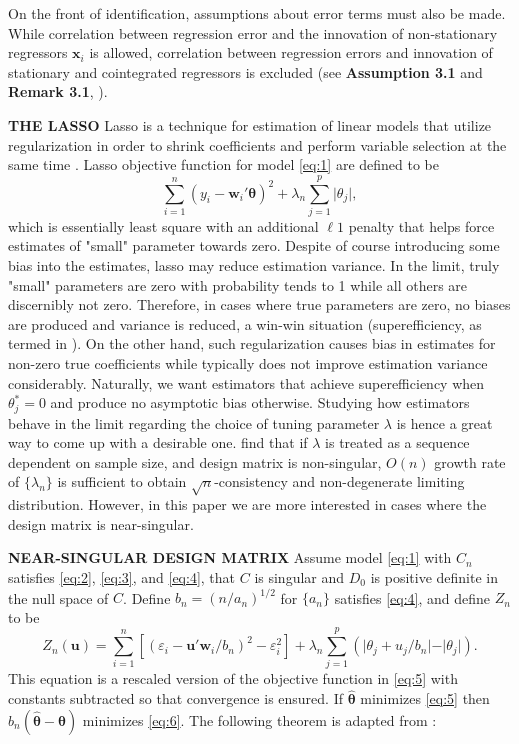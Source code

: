 \documentclass[12pt,a4paper]{article}
\DeclareMathOperator*{\argmin}{arg\,min} %
\begin{document}
On the front of identification, assumptions about error terms must also be made. While correlation between regression error and the innovation of non-stationary regressors $ \bm{x}_i $ is allowed, correlation between regression errors and innovation of stationary and cointegrated regressors is excluded (see \textbf{Assumption 3.1} and \textbf{Remark 3.1}, \cite{lee2018lasso}).


\textbf{THE LASSO}
Lasso is a technique for estimation of linear models that utilize regularization in order to shrink coefficients and perform variable selection at the same time \citep{tibshirani1996regression}. Lasso objective function for model \eqref{eq:1} are defined to be
\begin{equation}\label{eq:5}
	\sum_{i = 1}^n(y_i - \bm{w}_i'\bm{\theta})^2 + 
	\lambda_n\sum_{j = 1}^p\vert\theta_j\vert,
\end{equation}
which is essentially least square with an additional $ \ell1 $ penalty that helps force estimates of "small" parameter towards zero. Despite of course introducing some bias into the estimates, lasso may reduce estimation variance. In the limit, truly "small" parameters are zero with probability tends to 1 while all others are discernibly not zero. Therefore, in cases where true parameters are zero, no biases are produced and variance is reduced, a win-win situation (superefficiency, as termed in \cite{knight2008shrinkage}). On the other hand, such regularization causes bias in estimates for non-zero true coefficients while typically does not improve estimation variance considerably. Naturally, we want estimators that achieve superefficiency when $ \theta^*_j = 0 $ and produce no asymptotic bias otherwise. Studying how estimators behave in the limit regarding the choice of tuning parameter $ \lambda $ is hence a great way to come up with a desirable one. 
\cite{knight2000asymptotics} find that if $ \lambda $ is treated as a sequence dependent on sample size, and design matrix is non-singular, $ O(n) $ growth rate of $ \{\lambda_n\} $ is sufficient to obtain $ \sqrt{n} $-consistency and non-degenerate limiting distribution. However, in this paper we are more interested in cases where the design matrix is near-singular.

\textbf{NEAR-SINGULAR DESIGN MATRIX}
Assume model \eqref{eq:1} with $ C_n $ satisfies \eqref{eq:2}, \eqref{eq:3}, and \eqref{eq:4}, that $ C $ is singular and $ D_0 $ is positive definite in the null space of $ C $. Define $ b_n = (n/a_n)^{1/2} $ for $ \{a_n\} $ satisfies \eqref{eq:4}, and define $ Z_n $ to be
\begin{equation}\label{eq:6}
	Z_n(\bm{u}) = 
	\sum_{i = 1}^n[(\varepsilon_i - \bm{u}'\bm{w}_i/b_n)^2 - \varepsilon_i^2] +
	\lambda_n\sum_{j = 1}^{p}(\vert\theta_j + u_j/b_n\vert - \vert\theta_j\vert).
\end{equation}
This equation is a rescaled version of the objective function in \eqref{eq:5} with constants subtracted so that convergence is ensured. If $ \hat{\bm{\theta}} $ minimizes \eqref{eq:5} then $ b_n(\hat{\bm{\theta}} - \bm{\theta}) $ minimizes \eqref{eq:6}. The following theorem is adapted from \cite{knight2000asymptotics}:
\end{document}
